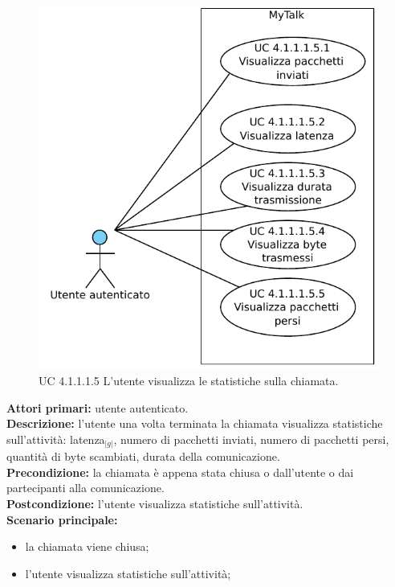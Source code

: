 \begin{figure}[htbp]
\centering
\includegraphics[scale=0.7]{./casi_uso/UC4-1-1-1-5.pdf}
\caption{UC 4.1.1.1.5 L'utente visualizza le statistiche sulla chiamata.}
\end{figure}

\noindent
\textbf{Attori primari:} utente autenticato.\\
\textbf{Descrizione:} l'utente una volta terminata la chiamata visualizza statistiche sull'attività: latenza$_{|g|}$, numero di pacchetti inviati, numero di pacchetti persi, quantità di byte scambiati, durata della comunicazione.\\
\textbf{Precondizione:} la chiamata è appena stata chiusa o dall'utente o dai partecipanti alla comunicazione.\\
\textbf{Postcondizione:} l'utente visualizza statistiche sull'attività.\\
\textbf{Scenario principale:}
\begin{itemize}
\item la chiamata viene chiusa;
\item l'utente visualizza statistiche sull'attività;
\end{itemize}


